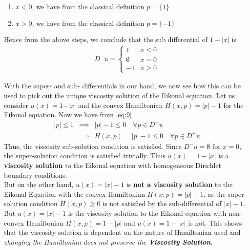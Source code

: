 \begin{example}
\begin{enumerate}
\item $x < 0$, we have from the classical definition $p = \{1\}$

\item $x > 0$, we have from the classical definition $p = \{-1\}$
\end{enumerate}
Hence from the above steps, we conclude that the sub differential of
$1-\lvert x \rvert$ is
\begin{eqnarray}
  D^-u = \left\{
  \begin{array}{ll}
    1 & x \le 0\\
    \emptyset & x = 0\\
    -1 & x\ge 0
  \end{array}
         \right. \label{eq:10}
\end{eqnarray}
\end{example}

\noindent
With the super- and sub- differentials in our hand, we now see how
this can be used to pick out the unique viscosity solution of the
Eikonal equation. Let us consider $u(x) = 1-\vert x \rvert$ and the
convex Hamiltonian $H(x,p) = \lvert p \rvert - 1$ for the Eikonal
equation. Now we have from \ref{eq:9}
\begin{eqnarray}
  \lvert p \rvert \le 1 &\implies& \lvert p \rvert - 1 \le 0\quad \forall p \in D^+u\\
                        &\implies& H(x,p) = \lvert p \rvert - 1 \le 0 \quad \forall p \in D^+u
\end{eqnarray}
Thus, the viscosity sub-solution condition is satisfied. Since $D^-u = \emptyset$ for $x=0$, the super-solution condition is satisfied trivially. Thus $u(x) = 1-\lvert x \rvert$ is a\textbf{ viscosity solution} to the Eikonal equation with homogeneous Dirichlet boundary conditions.\\

\noindent
But on the other hand, $u(x) = \lvert x \rvert - 1$ is \textbf{not a
  viscosity solution} to the Eikonal Equation with the convex
Hamiltonian $H(x,p) = \lvert p \rvert - 1$, as the super-solution
condition $H(x,p) \ge 0$ is not satisfied by the sub-differential of
$\lvert x \rvert - 1$. But $u(x) = \lvert x \rvert - 1$ is the
viscosity solution to the Eikonal equation with non-convex Hamiltonian
$H(x,p) = 1 - \lvert p \rvert$ and $u(x) = 1 - \lvert x \rvert$ is
not. This shows that the viscosity solution is dependent on the nature
of Hamiltonian used and \textit{changing the Hamiltonian does not
  preserve the \textbf{Viscosity Solution}}.

